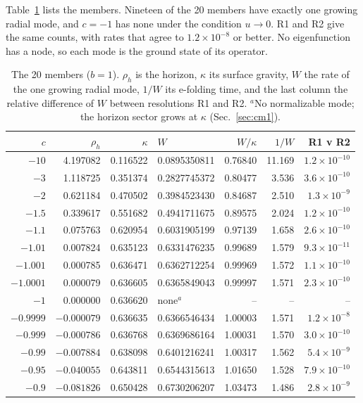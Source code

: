 \documentclass[11pt]{article}
\theoremstyle{plain}
\begin{document}
Table~\ref{tab:members} lists the members. Nineteen of the 20 members have exactly one growing radial mode, and $c=-1$ has
none under the condition $u\to0$. R1 and R2 give the same counts, with rates that agree to $1.2\times10^{-8}$ or better. No
eigenfunction has a node, so each mode is the ground state of its operator.
\begin{table}[t]
\centering
\caption{The 20 members ($b=1$). $\rho_h$ is the horizon, $\kappa$ its surface gravity, $W$ the rate of the one growing radial
mode, $1/W$ its e-folding time, and the last column the relative difference of $W$ between resolutions R1 and R2.
$^a$No normalizable mode; the horizon sector grows at $\kappa$ (Sec.~\ref{sec:cm1}).}
\label{tab:members}
\begin{tabular}{rrrlrrr}
\toprule
$c$ & $\rho_h$ & $\kappa$ & $W$ & $W/\kappa$ & $1/W$ & R1 v R2 \\
\midrule
$-10$ & 4.197082 & 0.116522 & 0.0895350811 & 0.76840 & 11.169 & $1.2\times10^{-10}$ \\
$-3$ & 1.118725 & 0.351374 & 0.2827745372 & 0.80477 & 3.536 & $3.6\times10^{-10}$ \\
$-2$ & 0.621184 & 0.470502 & 0.3984523430 & 0.84687 & 2.510 & $1.3\times10^{-9}$ \\
$-1.5$ & 0.339617 & 0.551682 & 0.4941711675 & 0.89575 & 2.024 & $1.2\times10^{-10}$ \\
$-1.1$ & 0.075763 & 0.620954 & 0.6031905199 & 0.97139 & 1.658 & $2.6\times10^{-10}$ \\
$-1.01$ & 0.007824 & 0.635123 & 0.6331476235 & 0.99689 & 1.579 & $9.3\times10^{-11}$ \\
$-1.001$ & 0.000785 & 0.636471 & 0.6362712254 & 0.99969 & 1.572 & $1.1\times10^{-10}$ \\
$-1.0001$ & 0.000079 & 0.636605 & 0.6365849043 & 0.99997 & 1.571 & $2.3\times10^{-10}$ \\
$-1$ & 0.000000 & 0.636620 & none$^a$ & -- & -- & -- \\
$-0.9999$ & $-0.000079$ & 0.636635 & 0.6366546434 & 1.00003 & 1.571 & $1.2\times10^{-8}$ \\
$-0.999$ & $-0.000786$ & 0.636768 & 0.6369686164 & 1.00031 & 1.570 & $3.0\times10^{-10}$ \\
$-0.99$ & $-0.007884$ & 0.638098 & 0.6401216241 & 1.00317 & 1.562 & $5.4\times10^{-9}$ \\
$-0.95$ & $-0.040055$ & 0.643811 & 0.6544315613 & 1.01650 & 1.528 & $7.9\times10^{-10}$ \\
$-0.9$ & $-0.081826$ & 0.650428 & 0.6730206207 & 1.03473 & 1.486 & $2.8\times10^{-9}$ \\

\end{tabular}
\end{table}
\end{document}
